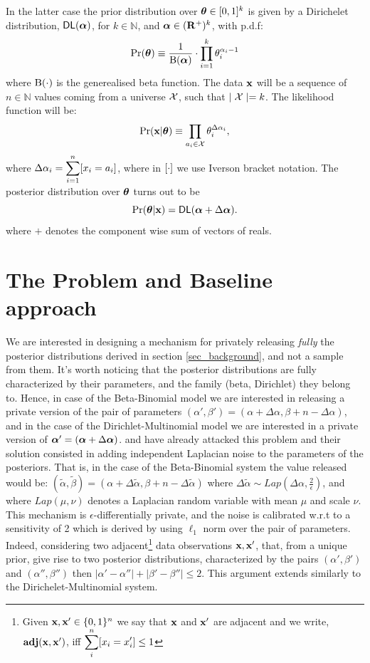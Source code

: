 \documentclass[sigconf, anonymous]{acmart}
\begin{document}
In the latter case the prior distribution over $\boldsymbol{\theta}\in [0,1]^{k}$ is given by a Dirichelet distribution, $\mathsf{DL}(\boldsymbol{\alpha})$, for $k\in\mathbb{N}$,
and $\boldsymbol{\alpha}\in(\mathbf{R^{+}})^{k}$, with p.d.f:
\[
  \Pr(\boldsymbol{\theta})\equiv\frac{1}{\boldsymbol{\textup{B}}(\boldsymbol{\alpha})}\cdot \displaystyle\prod_{i=1}^{k}{\theta_i^{\alpha_i-1}}
\]
where $\boldsymbol{\textup{B}}(\cdot)$ is the generealised beta function.
The data $\textbf{x}$ will be a sequence of $n\in\mathbb{N}$ values coming from a universe $\mathcal{X}$, such that $\mid\mathcal{X} \mid=k$.
The likelihood function will be:
\[
  \Pr(\textbf{x}|\boldsymbol{\theta})\equiv \displaystyle\prod_{a_i\in\mathcal{X}}\theta_{i}^{\Delta \alpha_i},
\]
where $\Delta \alpha_i=\displaystyle\sum_{i=1}^{n}[x_i=a_i]$, where in $[\cdot]$ we use
Iverson bracket notation. The posterior distribution over $\boldsymbol{\theta}$ turns out to be
\[
  \Pr(\boldsymbol{\theta}|\textbf{x})=\mathsf{DL}(\boldsymbol{\alpha}+\Delta \boldsymbol{\alpha}). 
\]
where $+$ denotes the component wise  sum of vectors of reals. 


\section{The Problem and Baseline approach}
We are interested in designing a mechanism for privately releasing
\emph{fully} the posterior distributions derived in section \ref{sec_background},
and not a sample from them.  It's worth noticing that the posterior
distributions are fully characterized by their parameters, and the
family (beta, Dirichlet) they belong to.  Hence, in case of the
Beta-Binomial model we are interested in releasing a private version
of the pair of parameters $(\alpha',\beta')=(\alpha + \Delta \alpha,\beta + n - \Delta \alpha)$, and
in the case of the Dirichlet-Multinomial model we are interested in a
private version of $\boldsymbol{\alpha}'=(\boldsymbol{\alpha} + \Delta \boldsymbol{\alpha})$. \citet{zhang2016differential} and \citet{xiao2012bayesian} have
already attacked this problem and their solution consisted in adding
independent Laplacian noise to the parameters of the posteriors. That
is, in the case of the Beta-Binomial system the value released would
be: $(\tilde\alpha,\tilde\beta)=(\alpha + \Delta \tilde\alpha,\beta + n - \Delta \tilde\alpha)$ where $\Delta \tilde\alpha\sim Lap(\Delta \alpha, \frac{2}{\epsilon})$, and
where $Lap(\mu,\nu)$
denotes a Laplacian random variable with mean $\mu$ and scale $\nu$.
This mechanism is $\epsilon$-differentially private, and the noise is
calibrated w.r.t to a sensitivity of 2 which is derived by using
$\ell_1$ norm over the pair of parameters. Indeed, considering two
adjacent\footnote{Given $\textbf{x}, \textbf{x}'\in\{0,1\}^{n}$ we say that $\textbf{x}$ and $\textbf{x}'$ are adjacent and we write, $\textbf{adj}(\textbf{x},\textbf{x}')$, iff
$\displaystyle \sum_{i}^{n}[x_i = x'_i ]\leq 1$ } data observations
$\textbf{x}, \textbf{x}'$, that, from a unique prior, give rise to two posterior
distributions, characterized by the pairs
$(\alpha',\beta')$ and $(\alpha'',\beta'')$ then
$|\alpha'-\alpha''|+|\beta'-\beta''|\leq 2$.
This argument extends similarly to the Dirichelet-Multinomial system.
\end{document}
